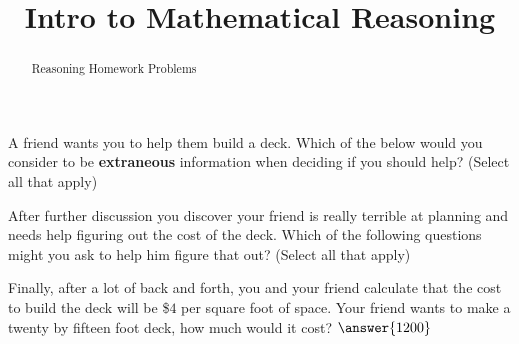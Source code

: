 \documentclass{ximera}
\title{Intro to Mathematical Reasoning}
\begin{document}
\begin{abstract}
Reasoning Homework Problems
\end{abstract}
\maketitle





\begin{problem}
    A friend wants you to help them build a deck. Which of the below would you consider to be \textbf{extraneous} information when deciding if you should help? (Select all that apply)
    \begin{selectAll}
    \end{selectAll}
    \begin{problem}
        After further discussion you discover your friend is really terrible at planning and needs help figuring out the cost of the deck. Which of the following questions might you ask to help him figure that out? (Select all that apply)
        \begin{selectAll}
        \end{selectAll}
        \begin{problem}
            Finally, after a lot of back and forth, you and your friend calculate that the cost to build the deck will be \$$4$ per square foot of space. Your friend wants to make a twenty by fifteen foot deck, how much would it cost? $\answer{1200}$
            
        \end{problem}
    \end{problem}
\end{problem}
\end{document}
